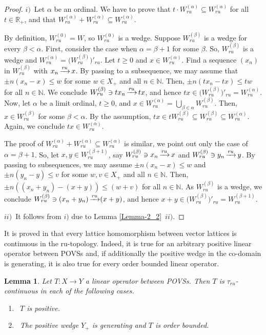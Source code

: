 \documentclass[10pt]{article}
\newtheorem{lemma}{Lemma}[section]
\DeclareMathOperator{\convr}{\xrightarrow[]{{\it ru}}}
\renewcommand{\a}{\alpha}
\renewcommand{\b}{\beta}
\begin{document}
\begin{proof}
$i)$\
Let ${\a}$ be an ordinal. 
We have to prove that $t\cdot W^{({\a})}_{ru}\subseteq W^{({\a})}_{ru}$ for all $t\in\mathbb{R}_+$, and that
$W^{({\a})}_{ru}+W^{({\a})}_{ru}\subseteq W^{({\a})}_{ru}$.

\smallskip
By definition, $W^{(0)}_{ru}=W$, so $W^{(0)}_{ru}$ is a wedge. 
Suppose $W^{(\b)}_{ru}$ is a wedge for every $\b<{\a}$.
First, consider the case when ${\a}=\b+1$ for some $\b$.
So, $W^{(\b)}_{ru}$ is a wedge and $W^{({\a})}_{ru}=\bigl(W^{(\b)}_{ru}\bigl)'_{ru}$.
Let $t\geqslant 0$ and $x\in W^{({\a})}_{ru}$. Find a sequence $(x_n)$ in $W^{(\b)}_{ru}$ with $x_n\convr x$.
By passing to a subsequence, we may assume that $\pm n(x_n-x)\leqslant w$ for some $w\in X_+$ and all $n\in\mathbb{N}$.
Then, $\pm n(tx_n-tx)\leqslant tw$ for all $n\in\mathbb{N}$. We conclude $W^{(\b)}_{ru}\ni tx_n\convr tx$, and hence 
$tx\in\bigl(W^{(\b)}_{ru}\bigl)'_{ru}=W^{({\a})}_{ru}$.
Now, let ${\a}$ be a limit ordinal, $t\geqslant 0$, and $x\in W^{({\a})}_{ru}=\bigcup\limits_{\b\in{\a}}W^{(\b)}_{ru}$.
Then, $x\in W^{(\b)}_{ru}$ for some $\b<{\a}$. By the assumption, $tx\in tW^{(\b)}_{ru}\subseteq W^{(\b)}_{ru}\subseteq W^{({\a})}_{ru}$.
Again, we conclude $tx\in W^{({\a})}_{ru}$.

\smallskip
The proof of $W^{({\a})}_{ru}+W^{({\a})}_{ru}\subseteq W^{({\a})}_{ru}$ is similar, we point out only the case of 
${\a}=\b+1$. So, let $x,y\in W^{(\b+1)}_{ru}$, say $W^{(\b)}_{ru}\ni x_n\convr x$ and $W^{(\b)}_{ru}\ni y_n\convr y$.
By passing to subsequences, we may assume $\pm n(x_n-x)\leqslant w$ and $\pm n(y_n-y)\leqslant v$ for some $w,v\in X_+$ and all $n\in\mathbb{N}$.
Then, $\pm n((x_n+y_n)-(x+y))\leqslant (w+v)$ for all $n\in\mathbb{N}$. As $W^{(\b)}_{ru}$ is a wedge, 
we conclude $W^{(\b)}_{ru}\ni (x_n+y_n)\convr (x+y)$, and hence $x+y\in\bigl(W^{(\b)}_{ru}\bigl)'_{ru}=W^{(\b+1)}_{ru}$.

\medskip
$ii)$\
It follows from $i)$ due to Lemma \ref{Lemma-2_2}~$ii)$.
\end{proof}

It is proved in \cite[Theorem 4.2]{LM-1967} that every lattice homomorphism between vector lattices is continuous
in the ru-topology. Indeed, it is true for an arbitrary positive linear operator between POVSs and, if additionally the positive wedge in the co-domain is generating, 
it is also true for every order bounded linear operator.

\begin{lemma}\label{Lemma-2_4}
Let $T:X\to Y$ a linear operator between POVSs. Then $T$ is $\tau_{ru}$-continuous in each of the following cases.
\begin{enumerate}[$i)$]
\item\
$T$ is positive.
\item\
The positive wedge $Y_+$ is generating and $T$ is order bounded.
\end{enumerate}
\end{lemma}
\end{document}
